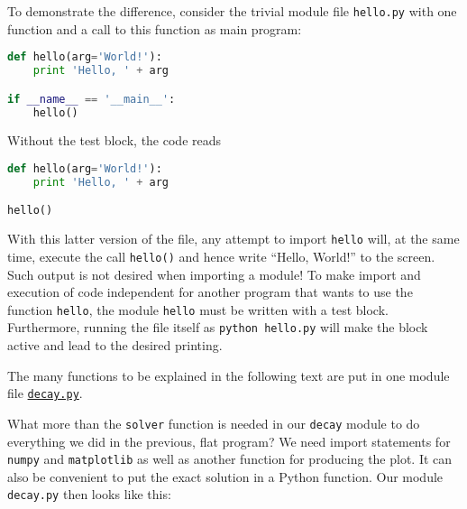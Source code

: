 \documentclass[graybox,sectrefs,envcountresetchap,open=right,final]{svmonodo}
\newenvironment{notice_mdfboxadmon}[1][]{
\begin{notice_mdfboxmdframed}[frametitle=#1]
}
{
\end{notice_mdfboxmdframed}
}
\begin{document}
To demonstrate the difference, consider the trivial module
file \texttt{hello.py} with one function and a call to this function as main program:

\begin{lstlisting}[language=Python,style=blue1bar_bluegreen]
def hello(arg='World!'):
    print 'Hello, ' + arg

if __name__ == '__main__':
    hello()
\end{lstlisting}
Without the test block, the code reads

\begin{lstlisting}[language=Python,style=blue1bar_bluegreen]
def hello(arg='World!'):
    print 'Hello, ' + arg

hello()
\end{lstlisting}
With this latter version of the file, any attempt to import \texttt{hello}
will, at the same time, execute the call \texttt{hello()} and hence write
``Hello, World!'' to the screen.  Such output is not desired when
importing a module!  To make import and execution of code independent
for another program that wants to use the function \texttt{hello}, the module
\texttt{hello} must be written with a test block. Furthermore, running the
file itself as \texttt{python hello.py} will make the block active and lead
to the desired printing.


\begin{notice_mdfboxadmon}
The many functions to be explained in the following text are
put in one module file \href{{http://tinyurl.com/ofkw6kc/softeng/decay.py}}{\nolinkurl{decay.py}}.
\end{notice_mdfboxadmon}



What more than the \texttt{solver} function is needed in our \texttt{decay} module
to do everything we did in the previous, flat program?  We need import
statements for \texttt{numpy} and \texttt{matplotlib} as well as another function
for producing the plot. It can also be convenient to put the exact
solution in a Python function.  Our module \texttt{decay.py} then looks like
this:
\end{document}

